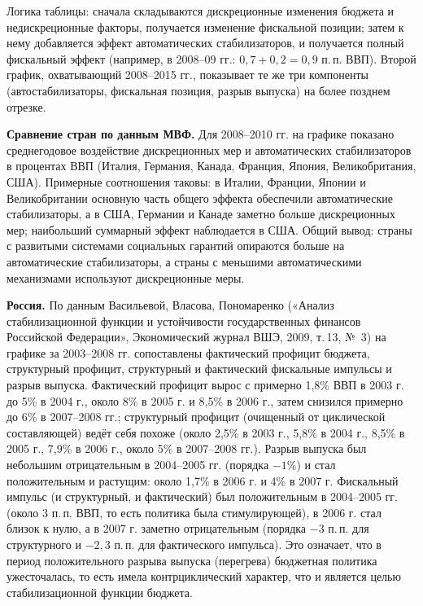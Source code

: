 \documentclass[11pt,a4paper]{article}
\begin{document}
Логика таблицы: сначала складываются дискреционные изменения бюджета и недискреционные факторы, получается изменение фискальной позиции; затем к нему добавляется эффект автоматических стабилизаторов, и получается полный фискальный эффект (например, в 2008--09 гг.: $0{,}7+0{,}2=0{,}9$ п.\,п. ВВП). Второй график, охватывающий 2008--2015 гг., показывает те же три компоненты (автостабилизаторы, фискальная позиция, разрыв выпуска) на более позднем отрезке.

\textbf{Сравнение стран по данным МВФ.} Для 2008--2010 гг. на графике показано среднегодовое воздействие дискреционных мер и автоматических стабилизаторов в процентах ВВП (Италия, Германия, Канада, Франция, Япония, Великобритания, США). Примерные соотношения таковы: в Италии, Франции, Японии и Великобритании основную часть общего эффекта обеспечили автоматические стабилизаторы, а в США, Германии и Канаде заметно больше дискреционных мер; наибольший суммарный эффект наблюдается в США. Общий вывод: страны с развитыми системами социальных гарантий опираются больше на автоматические стабилизаторы, а страны с меньшими автоматическими механизмами используют дискреционные меры.

\textbf{Россия.} По данным Васильевой, Власова, Пономаренко («Анализ стабилизационной функции и устойчивости государственных финансов Российской Федерации», Экономический журнал ВШЭ, 2009, т.\,13, №~3) на графике за 2003--2008 гг. сопоставлены фактический профицит бюджета, структурный профицит, структурный и фактический фискальные импульсы и разрыв выпуска. Фактический профицит вырос с примерно 1,8\% ВВП в 2003 г. до 5\% в 2004 г., около 8\% в 2005 г. и 8,5\% в 2006 г., затем снизился примерно до 6\% в 2007--2008 гг.; структурный профицит (очищенный от циклической составляющей) ведёт себя похоже (около 2,5\% в 2003 г., 5,8\% в 2004 г., 8,5\% в 2005 г., 7,9\% в 2006 г., около 5\% в 2007--2008 гг.). Разрыв выпуска был небольшим отрицательным в 2004--2005 гг. (порядка $-1$\%) и стал положительным и растущим: около 1,7\% в 2006 г. и 4\% в 2007 г. Фискальный импульс (и структурный, и фактический) был положительным в 2004--2005 гг. (около 3 п.\,п. ВВП, то есть политика была стимулирующей), в 2006 г. стал близок к нулю, а в 2007 г. заметно отрицательным (порядка $-3$ п.\,п. для структурного и $-2{,}3$ п.\,п. для фактического импульса). Это означает, что в период положительного разрыва выпуска (перегрева) бюджетная политика ужесточалась, то есть имела контрциклический характер, что и является целью стабилизационной функции бюджета.
\end{document}
